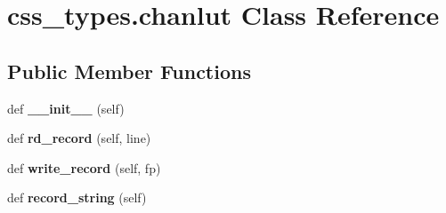 \hypertarget{classcss__types_1_1chanlut}{}\section{css\+\_\+types.\+chanlut Class Reference}
\label{classcss__types_1_1chanlut}
\subsection*{Public Member Functions}
\begin{DoxyCompactItemize}
\item 
\hypertarget{classcss__types_1_1chanlut_ad2e3b50f3d066a2166157cef57c58765}{}def {\bfseries \+\_\+\+\_\+init\+\_\+\+\_\+} (self)\label{classcss__types_1_1chanlut_ad2e3b50f3d066a2166157cef57c58765}

\item 
\hypertarget{classcss__types_1_1chanlut_a2d8e8cb0f3f45c22394354c277f6392d}{}def {\bfseries rd\+\_\+record} (self, line)\label{classcss__types_1_1chanlut_a2d8e8cb0f3f45c22394354c277f6392d}

\item 
\hypertarget{classcss__types_1_1chanlut_a2f0a8dcd4d6c508739914b31b36a2aa4}{}def {\bfseries write\+\_\+record} (self, fp)\label{classcss__types_1_1chanlut_a2f0a8dcd4d6c508739914b31b36a2aa4}

\item 
\hypertarget{classcss__types_1_1chanlut_aeaa914ad960181f3cf43fb91b8eb1619}{}def {\bfseries record\+\_\+string} (self)\label{classcss__types_1_1chanlut_aeaa914ad960181f3cf43fb91b8eb1619}

\end{DoxyCompactItemize}
